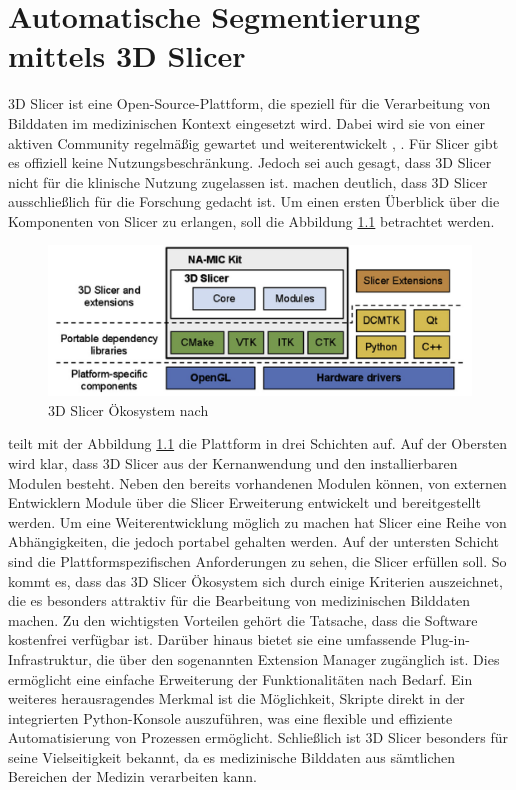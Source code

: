 \chapter{Automatische Segmentierung mittels 3D Slicer}
\label{sec:3d_slicer} 3D Slicer ist eine Open-Source-Plattform, die speziell für
die Verarbeitung von Bilddaten im medizinischen Kontext eingesetzt wird. Dabei wird
sie von einer aktiven Community regelmäßig gewartet und weiterentwickelt \citep[vgl.][]{slicer2024},
\citep[vgl.][S.~1325]{fedorov2012slicer}. Für Slicer gibt es offiziell keine Nutzungsbeschränkung.
Jedoch sei auch gesagt, dass 3D Slicer nicht für die klinische Nutzung zugelassen
ist. \citet[S.~1331]{fedorov2012slicer} machen deutlich, dass 3D Slicer
ausschließlich für die Forschung gedacht ist. Um einen ersten Überblick über die
Komponenten von Slicer zu erlangen, soll die Abbildung
\ref{fig:3d_slicer_oekosystem} betrachtet werden.

\begin{figure}[h]
	\centering
	\includegraphics[width=1\textwidth]{img/3d_slicer_overview.jpg}
	\caption{3D Slicer Ökosystem nach \citet[S.~1326]{fedorov2012slicer}}
	\label{fig:3d_slicer_oekosystem}
\end{figure}

\citet[S.~1326]{fedorov2012slicer} teilt mit der Abbildung
\ref{fig:3d_slicer_oekosystem} die Plattform in drei Schichten auf. Auf der Obersten
wird klar, dass 3D Slicer aus der Kernanwendung und den installierbaren Modulen
besteht. Neben den bereits vorhandenen Modulen können, von externen Entwicklern
Module über die Slicer Erweiterung entwickelt und bereitgestellt werden. Um eine
Weiterentwicklung möglich zu machen hat Slicer eine Reihe von Abhängigkeiten,
die jedoch portabel gehalten werden. Auf der untersten Schicht sind die Plattformspezifischen
Anforderungen zu sehen, die Slicer erfüllen soll. So kommt es, dass das 3D
Slicer Ökosystem sich durch einige Kriterien auszeichnet, die es besonders attraktiv
für die Bearbeitung von medizinischen Bilddaten machen. Zu den wichtigsten
Vorteilen gehört die Tatsache, dass die Software kostenfrei verfügbar ist.
Darüber hinaus bietet sie eine umfassende Plug-in-Infrastruktur, die über den sogenannten
Extension Manager zugänglich ist. Dies ermöglicht eine einfache Erweiterung der
Funktionalitäten nach Bedarf. Ein weiteres herausragendes Merkmal ist die Möglichkeit,
Skripte direkt in der integrierten Python-Konsole auszuführen, was eine flexible
und effiziente Automatisierung von Prozessen ermöglicht. Schließlich ist 3D
Slicer besonders für seine Vielseitigkeit bekannt, da es medizinische Bilddaten aus
sämtlichen Bereichen der Medizin verarbeiten kann.

